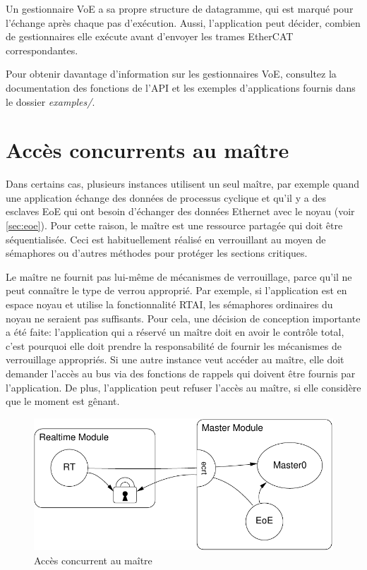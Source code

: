 \documentclass[a4paper,12pt,BCOR6mm,bibtotoc,idxtotoc]{scrbook}
\begin{document}
Un gestionnaire VoE a sa propre structure de datagramme, qui est
marqu\'e pour l'\'echange apr\`es chaque pas d'ex\'ecution. Aussi,
l'application peut d\'ecider, combien de gestionnaires elle ex\'ecute
avant d'envoyer les trames EtherCAT correspondantes.

Pour obtenir davantage d'information sur les gestionnaires VoE,
consultez la documentation des fonctions de l'API et les exemples
d'applications fournis dans le dossier \textit{examples/}.


\section{Acc\`es concurrents au ma\^itre}
\label{sec:concurr}

Dans certains cas,  plusieurs instances utilisent un seul ma\^itre,
par exemple quand une application \'echange des donn\'ees de processus
cyclique et qu'il y a des esclaves EoE qui ont besoin d'\'echanger des
donn\'ees Ethernet avec le noyau (voir \autoref{sec:eoe}). Pour
cette raison, le ma\^itre est une ressource partag\'ee qui doit \^etre
s\'equentialis\'ee. Ceci est habituellement r\'ealis\'e en
verrouillant au moyen de s\'emaphores ou d'autres m\'ethodes pour
prot\'eger les sections critiques.

Le ma\^itre ne fournit pas lui-m\^eme de m\'ecanismes de
verrouillage, parce qu'il ne peut conna\^itre le type de
verrou appropri\'e. Par exemple, si l'application est en espace noyau
et utilise la fonctionnalit\'e RTAI, les s\'emaphores ordinaires du
noyau ne seraient pas suffisants. Pour cela, une d\'ecision de
conception importante a \'et\'e faite: l'application qui a r\'eserv\'e
un ma\^itre doit en avoir le contr\^ole total, c'est pourquoi elle
doit prendre la responsabilit\'e de fournir les m\'ecanismes de
verrouillage appropri\'es.  Si une autre instance veut acc\'eder au
ma\^itre, elle doit demander l'acc\`es au bus via des fonctions de
rappels qui doivent \^etre fournis par l'application.  De plus,
l'application peut refuser l'acc\`es au ma\^itre, si elle consid\`ere
que le moment est g\^enant.

\begin{figure}[htbp]
  \centering
  \includegraphics[width=.6\textwidth]{images/master-locks}
  \caption{Acc\`es concurrent au ma\^itre}
  \label{fig:locks}
\end{figure}
\end{document}
